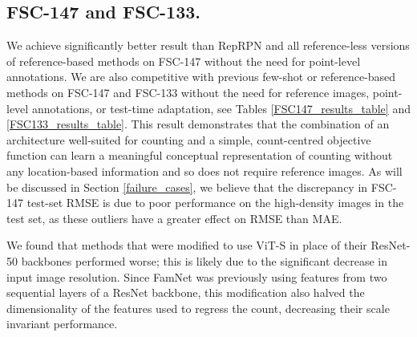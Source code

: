 \documentclass[letterpaper, 11pt]{IEEEtran}
\begin{document}
\subsection{FSC-147 and FSC-133.}
We achieve significantly better result than RepRPN and all reference-less versions of reference-based methods on FSC-147 without the need for point-level annotations. We are also competitive with previous few-shot or reference-based methods on FSC-147 and FSC-133 without the need for reference images, point-level annotations, or test-time adaptation, see Tables \ref{FSC147_results_table} and \ref{FSC133_results_table}. 
This result demonstrates that the combination of an architecture well-suited for counting and a simple, count-centred objective function can learn a meaningful conceptual representation of counting without any location-based information and so does not require reference images.
As will be discussed in Section \ref{failure_cases}, we believe that the discrepancy in FSC-147 test-set RMSE is due to  poor performance on the high-density images in the test set, as these outliers have a greater effect on RMSE than MAE.

We found that methods that were modified to use  ViT-S in place of their ResNet-50 backbones performed worse;
this is likely due to the significant decrease in input image resolution.
Since FamNet was previously using features from two sequential layers of a ResNet backbone, this modification also halved the dimensionality of the features used to regress the count, decreasing their scale invariant performance.
\end{document}
